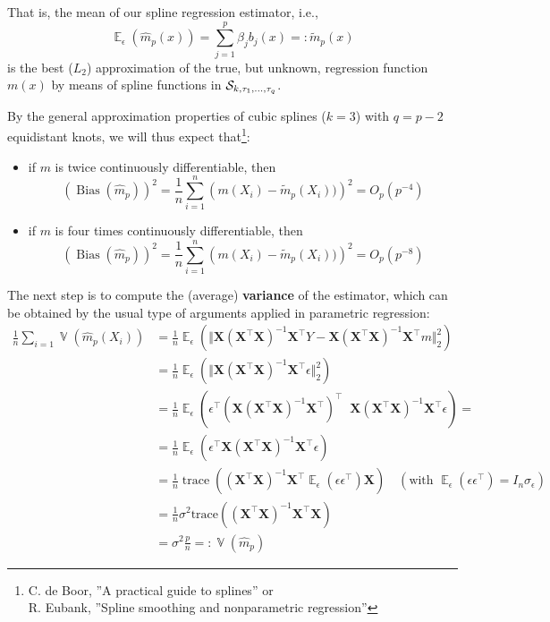\documentclass[14pt]{extreport}\usepackage[]{graphicx}\usepackage[]{xcolor}
\DeclareMathOperator{\E}{\mathbb{E}}
\DeclareMathOperator{\V}{\mathbb{V}}
\begin{document}
That is, the mean of our spline regression estimator, i.e., 
$$
\E_\epsilon(\hat m_p(x))=\sum_{j=1}^p \beta_j b_j(x)=:\tilde m_p(x)
$$
is the best ($L_2$) approximation of the true, but unknown, regression function $m(x)$ by means of spline functions
in ${\cal{S}}_{k,\tau_1,\dots,\tau_q}$.%

\bigskip

By the general approximation properties of cubic splines ($k=3$) with $q=p-2$ equidistant knots, we will
thus expect that\footnote{\noindent C. de Boor,  ''A practical guide to splines'' or\\
\hspace*{3.5ex} R. Eubank, ''Spline smoothing and nonparametric regression''}:
\begin{itemize}
\item if $m$ is twice continuously differentiable, then
$$(\operatorname{Bias}(\hat m_p))^2=\frac{1}{n}\sum_{i=1}^n \left(m(X_i)-\tilde m_p(X_i))\right)^2=O_p(p^{-4})$$
\item if $m$ is four times continuously differentiable, then
$$(\operatorname{Bias}(\hat m_p))^2=\frac{1}{n}\sum_{i=1}^n \left(m(X_i)-\tilde m_p(X_i))\right)^2=O_p(p^{-8})$$
\end{itemize}


\bigskip

The next step is to compute the (average) \textbf{variance} of the estimator, which can be obtained by the usual type of arguments applied in parametric regression:
\begin{align*}
\frac{1}{n}\sum_{i=1}\V(\hat{m}_p(X_i))&=
\frac{1}{n}\E_\epsilon\left(\Vert \mathbf{X}(\mathbf{X}^\top \mathbf{X})^{-1}\mathbf{X}^\top Y-
\mathbf{X}(\mathbf{X}^\top \mathbf{X})^{-1}\mathbf{X}^\top m\Vert_2^2\right)\\
&=\frac{1}{n}\E_\epsilon\left(\Vert \mathbf{X}(\mathbf{X}^\top \mathbf{X})^{-1}\mathbf{X}^\top \epsilon\Vert_2^2\right)\\
&= \frac{1}{n}\E_\epsilon\left(\epsilon^\top  (\mathbf{X}(\mathbf{X}^\top \mathbf{X})^{-1}\mathbf{X}^\top )^\top\;\;\mathbf{X}(\mathbf{X}^\top \mathbf{X})^{-1}\mathbf{X}^\top \epsilon\right)=\\
&= \frac{1}{n}\E_\epsilon\left(\epsilon^\top  \mathbf{X}(\mathbf{X}^\top \mathbf{X})^{-1}\mathbf{X}^\top \epsilon\right)\\
&=\frac{1}{n}\operatorname{trace}\left((\mathbf{X}^\top \mathbf{X})^{-1}\mathbf{X}^\top  \E_\epsilon(\epsilon\epsilon^\top ) \mathbf{X}\right)\quad(\text{with }\E_\epsilon(\epsilon\epsilon^\top )=I_n\sigma_\epsilon)\\
&=\frac{1}{n} \sigma^2 \text{trace}\left((\mathbf{X}^\top \mathbf{X})^{-1}\mathbf{X}^\top  \mathbf{X}\right)\\
&=\sigma^2  \frac{p}{n}=:\V(\hat{m}_p)
\end{align*}
\end{document}
